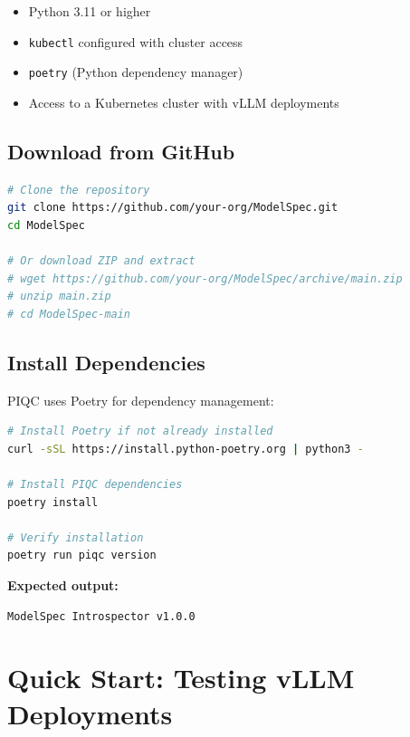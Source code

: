 \documentclass[11pt,a4paper]{article}
\begin{document}
\begin{itemize}
    \item Python 3.11 or higher
    \item \texttt{kubectl} configured with cluster access
    \item \texttt{poetry} (Python dependency manager)
    \item Access to a Kubernetes cluster with vLLM deployments
\end{itemize}

\subsection{Download from GitHub}

\begin{lstlisting}[language=bash]
# Clone the repository
git clone https://github.com/your-org/ModelSpec.git
cd ModelSpec

# Or download ZIP and extract
# wget https://github.com/your-org/ModelSpec/archive/main.zip
# unzip main.zip
# cd ModelSpec-main
\end{lstlisting}

\subsection{Install Dependencies}

PIQC uses Poetry for dependency management:

\begin{lstlisting}[language=bash]
# Install Poetry if not already installed
curl -sSL https://install.python-poetry.org | python3 -

# Install PIQC dependencies
poetry install

# Verify installation
poetry run piqc version
\end{lstlisting}

\textbf{Expected output:}
\begin{lstlisting}
ModelSpec Introspector v1.0.0
\end{lstlisting}

\section{Quick Start: Testing vLLM Deployments}
\end{document}
